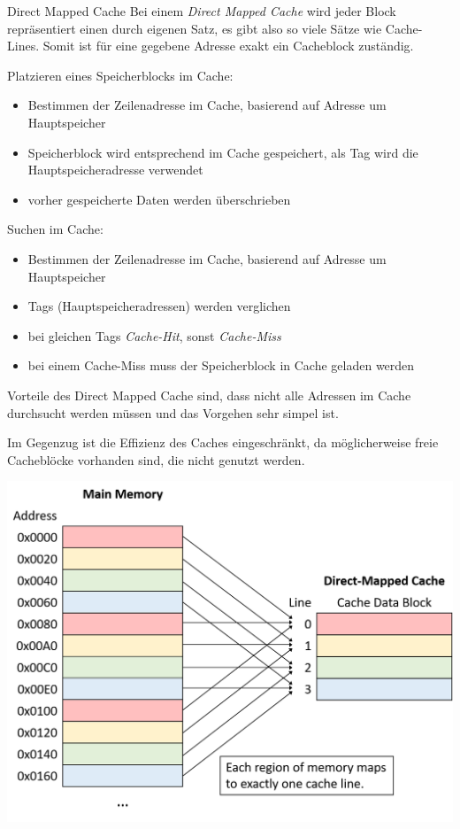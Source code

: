 \begin{defi}{Direct Mapped Cache}
    Bei einem \emph{Direct Mapped Cache} wird jeder Block repräsentiert einen durch eigenen Satz, es gibt also so viele Sätze wie Cache-Lines.
    Somit ist für eine gegebene Adresse exakt ein Cacheblock zuständig.

    Platzieren eines Speicherblocks im Cache:
    \begin{itemize}
        \item Bestimmen der Zeilenadresse im Cache, basierend auf Adresse um Hauptspeicher
        \item Speicherblock wird entsprechend im Cache gespeichert, als Tag wird die Hauptspeicheradresse verwendet
        \item vorher gespeicherte Daten werden überschrieben
    \end{itemize}

    Suchen im Cache:
    \begin{itemize}
        \item Bestimmen der Zeilenadresse im Cache, basierend auf Adresse um Hauptspeicher
        \item Tags (Hauptspeicheradressen) werden verglichen
        \item bei gleichen Tags \emph{Cache-Hit}, sonst \emph{Cache-Miss}
        \item bei einem Cache-Miss muss der Speicherblock in Cache geladen werden
    \end{itemize}

    Vorteile des Direct Mapped Cache sind, dass nicht alle Adressen im Cache durchsucht werden müssen und das Vorgehen sehr simpel ist.

    Im Gegenzug ist die Effizienz des Caches eingeschränkt, da möglicherweise freie Cacheblöcke vorhanden sind, die nicht genutzt werden.

    \centering
    \includegraphics[width=.6\linewidth]{images/direct_mapped_cache.png}
\end{defi}

